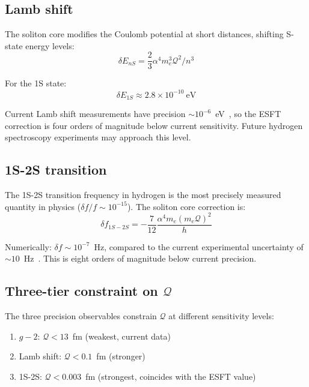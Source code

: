 ﻿\documentclass[twocolumn,preprintnumbers,amsmath,amssymb]{revtex4-2}
\newcommand{\Qoppa}{\mathcal{Q}}
\begin{document}
\subsection{Lamb shift}

The soliton core modifies the Coulomb potential at short distances, shifting S-state energy levels:
\begin{equation}
\delta E_{nS} = \frac{2}{3}\alpha^4 m_e^3 \Qoppa^2 / n^3
\label{eq:lamb}
\end{equation}

For the 1S state:
\begin{equation}
\delta E_{1S} \approx 2.8 \times 10^{-10}~\text{eV}
\end{equation}

Current Lamb shift measurements have precision $\sim 10^{-6}$~eV~\cite{Bezginov2019}, so the ESFT correction is four orders of magnitude below current sensitivity. Future hydrogen spectroscopy experiments may approach this level.

\subsection{1S-2S transition}

The 1S-2S transition frequency in hydrogen is the most precisely measured quantity in physics ($\delta f/f \sim 10^{-15}$). The soliton core correction is:
\begin{equation}
\delta f_{1S-2S} = -\frac{7}{12}\frac{\alpha^4 m_e (m_e \Qoppa)^2}{h}
\label{eq:1s2s}
\end{equation}

Numerically: $\delta f \sim 10^{-7}$~Hz, compared to the current experimental uncertainty of $\sim 10$~Hz~\cite{Parthey2011}. This is eight orders of magnitude below current precision.

\subsection{Three-tier constraint on $\Qoppa$}

The three precision observables constrain $\Qoppa$ at different sensitivity levels:
\begin{enumerate}
\item $g{-}2$: $\Qoppa < 13$~fm (weakest, current data)
\item Lamb shift: $\Qoppa < 0.1$~fm (stronger)
\item 1S-2S: $\Qoppa < 0.003$~fm (strongest, coincides with the ESFT value)
\end{enumerate}
\end{document}

